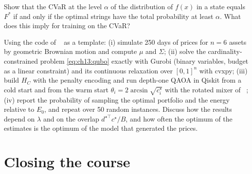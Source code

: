 \documentclass[handoutsbeamer.tex]{subfiles}
\begin{document}
\begin{frame}
\onp{\footnotesize}
\begin{exe}\label{exe:ch13:cvar}
Show that the CVaR at the level $\alpha$ of the distribution of $f(x)$ in a state equals $F^*$ if and only if the optimal strings have the total probability at least $\alpha$. What does this imply for training on the CVaR?
\end{exe}
\begin{exe}\label{exe:ch13:pipeline}
Using the code of \Chap~ as a template: (i) simulate 250 days of prices for $n = 6$ assets by geometric Brownian motion and compute $\mu$ and $\Sigma$; (ii) solve the cardinality-constrained problem \eqref{eq:ch13:qubo} exactly with Gurobi (binary variables, budget as a linear constraint) and its continuous relaxation over $[0,1]^n$ with cvxpy; (iii) build $H_C$ with the penalty encoding and run depth-one QAOA in Qiskit from a cold start and from the warm start $\theta_i = 2\arcsin\sqrt{c_i^\star}$ with the rotated mixer of \Chap~; (iv) report the probability of sampling the optimal portfolio and the energy relative to $E_0$, and repeat over 50 random instances. Discuss how the results depend on $\lambda$ and on the overlap $d^{\star\top}c^\star/B$, and how often the optimum of the estimates is the optimum of the model that generated the prices.
\end{exe}
\end{frame}

\section{Closing the course}
\end{document}
